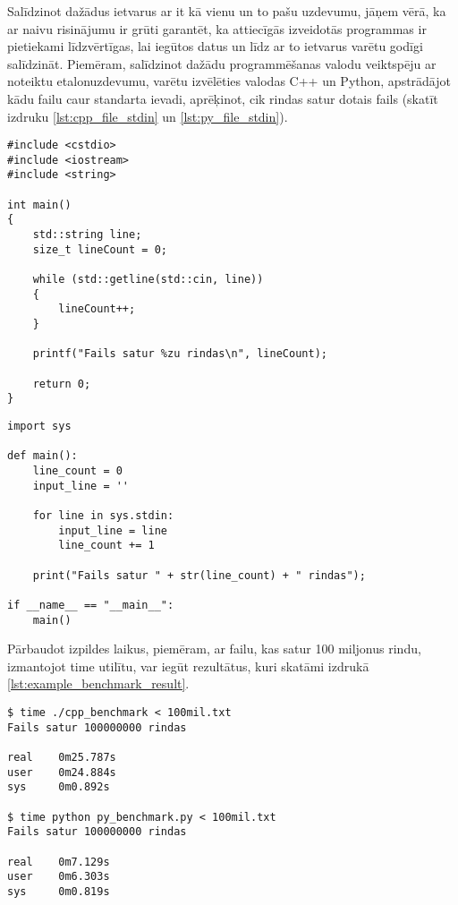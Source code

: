 Salīdzinot dažādus ietvarus ar it kā vienu un to pašu uzdevumu, jāņem vērā, ka
ar naivu risinājumu ir grūti garantēt, ka attiecīgās izveidotās programmas ir
pietiekami līdzvērtīgas, lai iegūtos datus un līdz ar to ietvarus varētu godīgi
salīdzināt. Piemēram, salīdzinot dažādu programmēšanas valodu veiktspēju ar noteiktu
etalonuzdevumu, varētu izvēlēties valodas C++ un Python, apstrādājot kādu failu
caur standarta ievadi, aprēķinot, cik rindas satur dotais fails (skatīt izdruku
\ref{lst:cpp_file_stdin} un \ref{lst:py_file_stdin}).

\begin{lstlisting}[caption={Vienkārša faila apstrāde valodā C++ caur standarta ievadi},
  label=lst:cpp_file_stdin,
  captionpos=b
]
#include <cstdio>
#include <iostream>
#include <string>

int main()
{
	std::string line;
	size_t lineCount = 0;

	while (std::getline(std::cin, line))
	{
		lineCount++;
	}

	printf("Fails satur %zu rindas\n", lineCount);

	return 0;
}
\end{lstlisting}


\begin{lstlisting}[caption={Vienkārša faila apstrāde Python valodā caur standarta ievadi},
  label=lst:py_file_stdin,
  captionpos=b
]
import sys 

def main():
    line_count = 0
    input_line = ''

    for line in sys.stdin:
        input_line = line
        line_count += 1

    print("Fails satur " + str(line_count) + " rindas");

if __name__ == "__main__":
    main()
\end{lstlisting}

Pārbaudot izpildes laikus, piemēram, ar failu, kas satur 100 miljonus rindu,
izmantojot time\cite{time_man_page} utilītu, var iegūt rezultātus, kuri skatāmi
izdrukā \ref{lst:example_benchmark_result}.

\begin{lstlisting}[caption={Etalonuzdevuma rezultāti failam ar 100 miljoniem rindu},
  label=lst:example_benchmark_result,
  captionpos=b
]
$ time ./cpp_benchmark < 100mil.txt 
Fails satur 100000000 rindas

real    0m25.787s
user    0m24.884s
sys     0m0.892s

$ time python py_benchmark.py < 100mil.txt 
Fails satur 100000000 rindas

real    0m7.129s
user    0m6.303s
sys     0m0.819s
\end{lstlisting}

